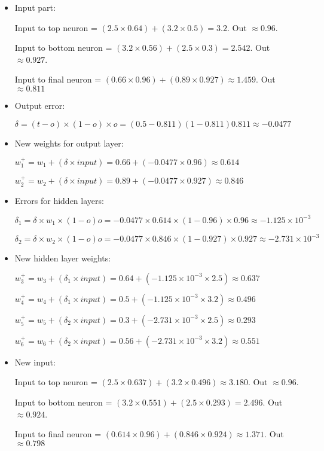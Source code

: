 \documentclass{article}
\begin{document}
\begin{itemize}
    \item Input part:
    
    Input to top neuron = $(2.5 \times 0.64) + (3.2 \times 0.5) = 3.2$. Out $\approx 0.96$.
    
    Input to bottom neuron = $(3.2 \times 0.56) + (2.5 \times 0.3) = 2.542$. Out $\approx 0.927$.
    
    Input to final neuron = $(0.66 \times 0.96) + (0.89 \times 0.927) \approx 1.459$. Out $\approx 0.811$
    
    \item Output error:
    
    $\delta = (t-o)\times(1-o)\times o = (0.5 - 0.811)(1 - 0.811)0.811 \approx -0.0477$
    
    \item New weights for output layer:
    
    $w^{+}_1 = w_1 + (\delta \times input) = 0.66 + (-0.0477 \times 0.96) \approx 0.614$
    
    $w^{+}_2 = w_2 + (\delta \times input) = 0.89 + (-0.0477 \times 0.927) \approx 0.846$
    
    \item Errors for hidden layers:
    
    $\delta_1 = \delta \times w_1 \times (1 - o)o = -0.0477 \times 0.614 \times (1 - 0.96) \times 0.96 \approx -1.125\times 10^{-3}$
    
    $\delta_2 = \delta \times w_2 \times (1 - o)o = -0.0477 \times 0.846 \times (1 - 0.927) \times 0.927 \approx -2.731\times 10^{-3}$
    
    \item New hidden layer weights:
    
    $w^{+}_3 = w_3 + (\delta_1 \times input) = 0.64 + (-1.125\times 10^{-3} \times 2.5) \approx 0.637$
    
    $w^{+}_4 = w_4 + (\delta_1 \times input) = 0.5 + (-1.125\times 10^{-3} \times 3.2) \approx 0.496$
    
    $w^{+}_5 = w_5 + (\delta_2 \times input) = 0.3 + (-2.731\times 10^{-3} \times 2.5) \approx 0.293$
    
    $w^{+}_6 = w_6 + (\delta_2 \times input) = 0.56 + (-2.731\times 10^{-3} \times 3.2) \approx 0.551$
    
    \item New input:
    
    Input to top neuron = $(2.5 \times 0.637) + (3.2 \times 0.496) \approx 3.180$. Out $\approx 0.96$.
    
    Input to bottom neuron = $(3.2 \times 0.551) + (2.5 \times 0.293) = 2.496$. Out $\approx 0.924$.
    
    Input to final neuron = $(0.614 \times 0.96) + (0.846 \times 0.924) \approx 1.371$. Out $\approx 0.798$
    
\end{itemize}
\end{document}
